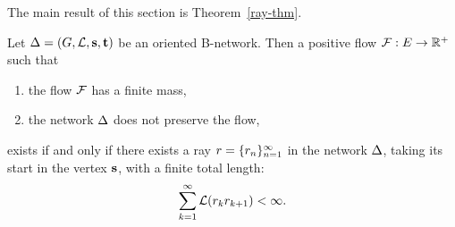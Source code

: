 \documentclass[12pt,oneside,a4paper]{amsart}
\begin{document}
    The main result of this section is Theorem~\ref{ray-thm}.
    \begin{theorem}
      \label{ray-thm}
      Let $\Delta = (G, \mathcal{L}, \mathbf{s}, \mathbf{t})$ be an oriented B-network.
      Then a positive flow $\mathcal{F}: E \to \mathbb{R}^{+}$ such that
      \begin{enumerate}[label=(\alph*)]
        \item the flow $\mathcal{F}$ has a finite mass,
        \item the network $\Delta$ does not preserve the flow,
      \end{enumerate}
        exists if and only if there exists a ray $r = \{{r}_n\}_{n=1}^\infty$ in the network $\Delta$, taking its start in the vertex $\mathbf{s}$,
          with a finite total length:
        \[
          \sum_{k=1}^\infty \mathcal{L}(r_k r_{k+1}) < \infty.
        \]
    \end{theorem}
\end{document}
